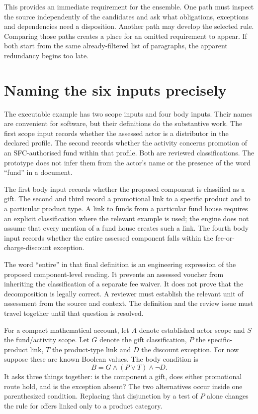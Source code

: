 This provides an immediate requirement for the ensemble. One path must inspect
the source independently of the candidates and ask what obligations, exceptions
and dependencies need a disposition. Another path may develop the selected
rule. Comparing those paths creates a place for an omitted requirement to
appear. If both start from the same already-filtered list of paragraphs, the
apparent redundancy begins too late.

\section{Naming the six inputs precisely}
\label{sec:circular-inputs}
The executable example has two scope inputs and four body inputs. Their names
are convenient for software, but their definitions do the substantive work.
The first scope input records whether the assessed actor is a distributor in
the declared profile. The second records whether the activity concerns promotion
of an SFC-authorised fund within that profile. Both are reviewed classifications.
The prototype does not infer them from the actor's name or the presence of the
word ``fund'' in a document.

The first body input records whether the proposed component is classified as a
gift. The second and third record a promotional link to a specific product and
to a particular product type. A link to funds from a particular fund house
requires an explicit classification where the relevant example is used; the
engine does not assume that every mention of a fund house creates such a link.
The fourth body input records whether the entire assessed component falls
within the fee-or-charge-discount exception.

The word ``entire'' in that final definition is an engineering expression of
the proposed component-level reading. It prevents an assessed voucher from
inheriting the classification of a separate fee waiver. It does not prove that
the decomposition is legally correct. A reviewer must establish the relevant
unit of assessment from the source and context. The definition and the review
issue must travel together until that question is resolved.

For a compact mathematical account, let $A$ denote established actor scope and
$S$ the fund/activity scope. Let $G$ denote the gift classification, $P$ the
specific-product link, $T$ the product-type link and $D$ the discount exception.
For now suppose these are known Boolean values. The body condition is
\begin{equation}
 B=G\land(P\lor T)\land\neg D.
 \label{eq:gift-body}
\end{equation}
It asks three things together: is the component a gift, does either promotional
route hold, and is the exception absent? The two alternatives occur inside one
parenthesized condition. Replacing that disjunction by a test of $P$ alone
changes the rule for offers linked only to a product category.

